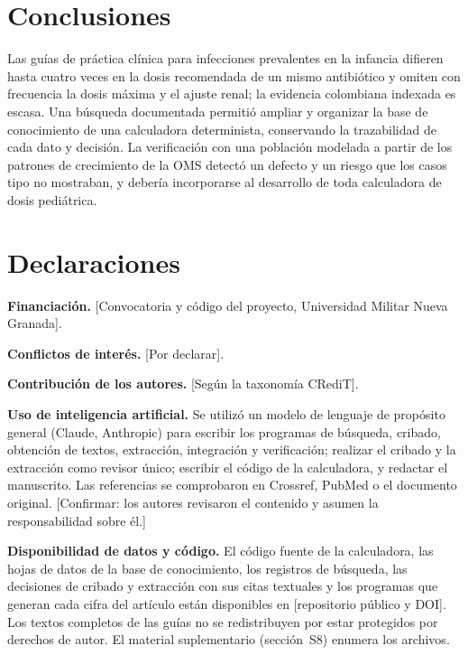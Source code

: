\documentclass[11pt,a4paper]{article}
\newcommand{\pendiente}[1]{\textcolor{rojo}{[#1]}}
\begin{document}
\section{Conclusiones}

Las guías de práctica clínica para infecciones prevalentes en la infancia difieren hasta cuatro veces en la dosis recomendada de un mismo antibiótico y omiten con frecuencia la dosis máxima y el ajuste renal; la evidencia colombiana indexada es escasa. Una búsqueda documentada permitió ampliar y organizar la base de conocimiento de una calculadora determinista, conservando la trazabilidad de cada dato y decisión. La verificación con una población modelada a partir de los patrones de crecimiento de la OMS detectó un defecto y un riesgo que los casos tipo no mostraban, y debería incorporarse al desarrollo de toda calculadora de dosis pediátrica.

\section{Declaraciones}

\noindent\textbf{Financiación.} \pendiente{Convocatoria y código del proyecto, Universidad Militar Nueva Granada}.

\noindent\textbf{Conflictos de interés.} \pendiente{Por declarar}.

\noindent\textbf{Contribución de los autores.} \pendiente{Según la taxonomía CRediT}.

\noindent\textbf{Uso de inteligencia artificial.} Se utilizó un modelo de lenguaje de propósito general (Claude, Anthropic) para escribir los programas de búsqueda, cribado, obtención de textos, extracción, integración y verificación; realizar el cribado y la extracción como revisor único; escribir el código de la calculadora, y redactar el manuscrito. Las referencias se comprobaron en Crossref, PubMed o el documento original. \pendiente{Confirmar: los autores revisaron el contenido y asumen la responsabilidad sobre él.}

\noindent\textbf{Disponibilidad de datos y código.} El código fuente de la calculadora, las hojas de datos de la base de conocimiento, los registros de búsqueda, las decisiones de cribado y extracción con sus citas textuales y los programas que generan cada cifra del artículo están disponibles en \pendiente{repositorio público y DOI}. Los textos completos de las guías no se redistribuyen por estar protegidos por derechos de autor. El material suplementario (sección~S8) enumera los archivos.



\end{document}
